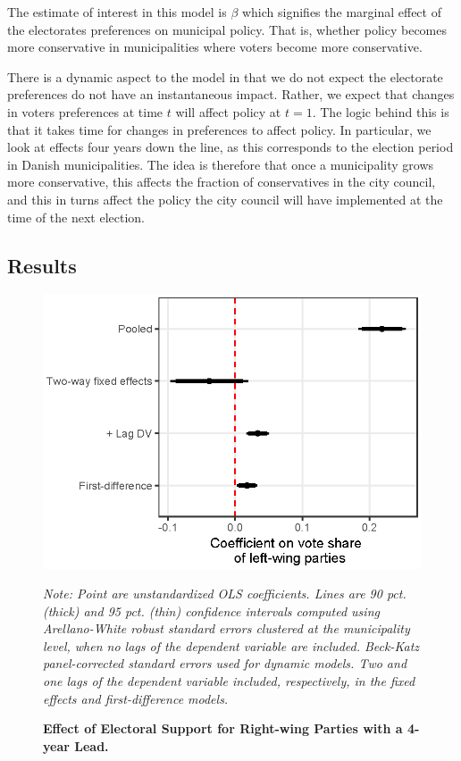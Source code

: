 \documentclass[a4paper,12pt]{article}
\newcommand\fnote[1]{\captionsetup{font=small}\caption*{#1}}
\begin{document}
The estimate of interest in this model is $\beta$ which signifies the marginal effect of the electorates preferences on municipal policy. That is, whether policy becomes more conservative in municipalities where voters become more conservative. 

There is a dynamic aspect to the model in that we do not expect the electorate preferences do not have an instantaneous impact. Rather, we expect that changes in voters preferences at time $t$ will affect policy at $t=1$. The logic behind this is that it takes time for changes in preferences to affect policy. In particular, we look at effects four years down the line, as this corresponds to the election period in Danish municipalities. The idea is therefore that once a municipality grows more conservative, this affects the fraction of conservatives in the city council, and this in turns affect the policy the city council will have implemented at the time of the next election. 

\subsection{Results}



\begin{figure}[h]
	\centering
	\includegraphics[scale = 1.1]{ggplot_coef_inflation_adjusted.eps}
	\caption{\textbf{Effect of Electoral Support for Right-wing Parties with a 4-year Lead.}} \fnote{\emph{Note: Point are unstandardized OLS coefficients. Lines are 90 pct. (thick) and 95 pct. (thin) confidence intervals computed using Arellano-White robust standard errors clustered at the municipality level, when no lags of the dependent variable are included. Beck-Katz panel-corrected standard errors used for dynamic models. Two and one lags of the dependent variable included, respectively, in the fixed effects and first-difference models.}}
	\label{fig:FourYearLead}
\end{figure}
\end{document}
